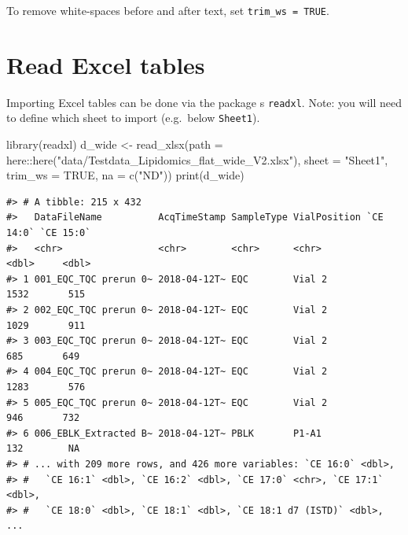 \documentclass[
  letterpaper,
  DIV=11,
  numbers=noendperiod]{scrreprt}
\newenvironment{Shaded}{\begin{snugshade}}{\end{snugshade}}
\newcommand{\AttributeTok}[1]{\textcolor[rgb]{0.40,0.45,0.13}{#1}}
\newcommand{\ConstantTok}[1]{\textcolor[rgb]{0.56,0.35,0.01}{#1}}
\newcommand{\FunctionTok}[1]{\textcolor[rgb]{0.28,0.35,0.67}{#1}}
\newcommand{\NormalTok}[1]{\textcolor[rgb]{0.00,0.23,0.31}{#1}}
\newcommand{\OtherTok}[1]{\textcolor[rgb]{0.00,0.23,0.31}{#1}}
\newcommand{\SpecialCharTok}[1]{\textcolor[rgb]{0.37,0.37,0.37}{#1}}
\newcommand{\StringTok}[1]{\textcolor[rgb]{0.13,0.47,0.30}{#1}}
\begin{document}
To remove white-spaces before and after text, set
\texttt{trim\_ws\ =\ TRUE}.

\hypertarget{read-excel-tables}{%
\section{Read Excel tables}\label{read-excel-tables}}

Importing Excel tables can be done via the package s \texttt{readxl}.
Note: you will need to define which sheet to import (e.g.~below
\texttt{Sheet1}).

\begin{Shaded}
\begin{Highlighting}[]
\FunctionTok{library}\NormalTok{(readxl)}
\NormalTok{d\_wide }\OtherTok{\textless{}{-}} \FunctionTok{read\_xlsx}\NormalTok{(}\AttributeTok{path =}\NormalTok{ here}\SpecialCharTok{::}\FunctionTok{here}\NormalTok{(}\StringTok{"data/Testdata\_Lipidomics\_flat\_wide\_V2.xlsx"}\NormalTok{),}
                            \AttributeTok{sheet =} \StringTok{"Sheet1"}\NormalTok{,}
                            \AttributeTok{trim\_ws =} \ConstantTok{TRUE}\NormalTok{, }
                            \AttributeTok{na =} \FunctionTok{c}\NormalTok{(}\StringTok{"ND"}\NormalTok{))}
\FunctionTok{print}\NormalTok{(d\_wide)}
\end{Highlighting}
\end{Shaded}

\begin{verbatim}
#> # A tibble: 215 x 432
#>   DataFileName          AcqTimeStamp SampleType VialPosition `CE 14:0` `CE 15:0`
#>   <chr>                 <chr>        <chr>      <chr>            <dbl>     <dbl>
#> 1 001_EQC_TQC prerun 0~ 2018-04-12T~ EQC        Vial 2            1532       515
#> 2 002_EQC_TQC prerun 0~ 2018-04-12T~ EQC        Vial 2            1029       911
#> 3 003_EQC_TQC prerun 0~ 2018-04-12T~ EQC        Vial 2             685       649
#> 4 004_EQC_TQC prerun 0~ 2018-04-12T~ EQC        Vial 2            1283       576
#> 5 005_EQC_TQC prerun 0~ 2018-04-12T~ EQC        Vial 2             946       732
#> 6 006_EBLK_Extracted B~ 2018-04-12T~ PBLK       P1-A1              132        NA
#> # ... with 209 more rows, and 426 more variables: `CE 16:0` <dbl>,
#> #   `CE 16:1` <dbl>, `CE 16:2` <dbl>, `CE 17:0` <chr>, `CE 17:1` <dbl>,
#> #   `CE 18:0` <dbl>, `CE 18:1` <dbl>, `CE 18:1 d7 (ISTD)` <dbl>, ...
\end{verbatim}
\end{document}
